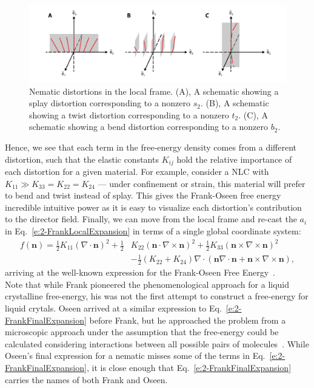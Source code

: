 \begin{figure}
  \centering
  \includegraphics{figures/C2/Ch2-Figs_FrankDist.png}
  \caption{Nematic distortions in the local frame. (A), A schematic showing a splay distortion corresponding to a nonzero $s_2$.
  (B), A schematic showing a twist distortion corresponding to a nonzero $t_2$.
  (C), A schematic showing a bend distortion corresponding to a nonzero $b_2$.}\label{f:2-FrankDist}
\end{figure}
Hence, we see that each term in the free-energy density comes from a different distortion, such that the elastic constants $K_{ij}$ hold the relative importance of each distortion for a given material.
For example, consider a NLC with $K_{11} \gg K_{33} = K_{22} = K_{24}$ --- under confinement or strain, this material will prefer to bend and twist instead of splay.
This gives the Frank-Oseen free energy incredible intuitive power as it is easy to visualize each distortion's contribution to the director field.
Finally, we can move from the local frame and re-cast the $a_i$ in Eq.~\ref{e:2-FrankLocalExpansion} in terms of a single global coordinate system:
\begin{align}
  f(\mathbf{n}) = \frac{1}{2}K_{11} (\nabla \cdot \mathbf{n})^2 + \frac{1}{2}&K_{22} (\mathbf{n} \cdot \nabla \times \mathbf{n})^2 + \frac{1}{2}K_{33} (\mathbf{n} \times \nabla \times \mathbf{n})^2 \nonumber \\
    & - \frac{1}{2}(K_{22} + K_{24}) \nabla \cdot (\mathbf{n}\nabla \cdot \mathbf{n} + \mathbf{n} \times \nabla \times \mathbf{n}),\label{e:2-FrankFinalExpansion}
\end{align}
arriving at the well-known expression for the Frank-Oseen Free Energy~\cite{RN61}.\\

Note that while Frank pioneered the phenomenological approach for a liquid crystalline free-energy, his was not the first attempt to construct a free-energy for liquid crytals.
Oseen arrived at a similar expression to Eq.~\ref{e:2-FrankFinalExpansion} before Frank, but he approached the problem from a microscopic approach under the assumption that the free-energy could be calculated considering interactions between all possible pairs of molecules~\cite{RN205}.
While Oseen's final expression for a nematic misses some of the terms in Eq.~\ref{e:2-FrankFinalExpansion}, it is close enough that Eq.~\ref{e:2-FrankFinalExpansion} carries the names of both Frank and Oseen.


